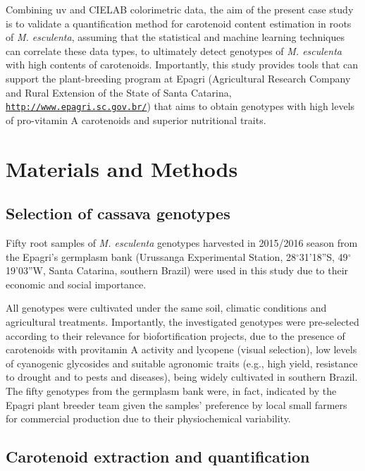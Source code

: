 Combining \gls{uv} and CIELAB colorimetric data, the aim of the present case study is to validate a quantification method for carotenoid content estimation in roots of \textit{M. esculenta}, assuming that the statistical and machine learning techniques can correlate these data types, to ultimately detect genotypes of \textit{M. esculenta} with high contents of carotenoids. Importantly, this study provides tools that can support the plant-breeding program at Epagri (Agricultural Research Company and Rural Extension of the State of Santa Catarina, \href{http://www.epagri.sc.gov.br/}{\nolinkurl{http://www.epagri.sc.gov.br/}}) that aims to obtain genotypes with high levels of pro-vitamin A carotenoids and superior nutritional traits.


\section{Materials and Methods} \label{MM}

\subsection{Selection of cassava genotypes} \label{cassava_gen}

Fifty root samples of \textit{M. esculenta} genotypes harvested in 2015/2016 season from the Epagri's germplasm bank (Urussanga Experimental Station, 28$^{\circ}$31'18''S, 49$^{\circ}$19'03''W, Santa Catarina, southern Brazil) were used in this study due to their economic and social importance.

All genotypes were cultivated under the same soil, climatic conditions and agricultural treatments. Importantly, the investigated genotypes were pre-selected according to their relevance for biofortification projects, due to the presence of carotenoids with provitamin A activity and lycopene (visual selection), low levels of cyanogenic glycosides and suitable agronomic traits (e.g., high yield, resistance to drought and to pests and diseases), being widely cultivated in southern Brazil. The fifty genotypes from the germplasm bank were, in fact, indicated by the Epagri plant breeder team given the samples' preference by local small farmers for commercial production due to their physiochemical variability.  


\subsection{Carotenoid extraction and quantification} \label{carot_quant}

